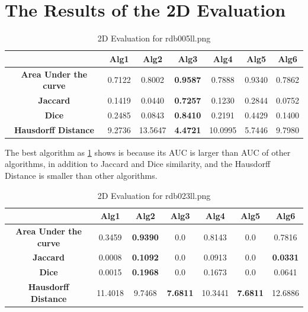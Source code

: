 \documentclass[a4paper, 11pt]{article}
\begin{document}


\section*{The Results of the 2D Evaluation \cite{wikipedia_2022} \cite{wikipedia_2023}} 

\begin{table}[h!]
\centering
\begin{tabular}{|c|c|c|c|c|c|c|}
\hline
{} & \textbf{Alg1} & \textbf{Alg2} & \textbf{Alg3} & \textbf{Alg4} & \textbf{Alg5} & \textbf{Alg6} \\
\hline
\textbf{Area Under the curve} & 0.7122 & 0.8002 & \textbf{0.9587} & 0.7888 & 0.9340 & 0.7862 \\
\hline
\textbf{Jaccard} & 0.1419 & 0.0440 & \textbf{0.7257} & 0.1230 & 0.2844 & 0.0752 \\
\hline
\textbf{Dice} & 0.2485 & 0.0843 & \textbf{0.8410} & 0.2191 & 0.4429 & 0.1400 \\
\hline
\textbf{Hausdorff Distance} & {9.2736} & {13.5647} & \textbf{4.4721} & {10.0995} & {5.7446} & {9.7980} \\
\hline
\end{tabular}
\caption{\label{tab:2d_evaluation1} 2D Evaluation for rdb005ll.png}
\end{table}

The best algorithm as \ref{tab:2d_evaluation1} shows is  because its AUC is larger than AUC of other algorithms, in addition to Jaccard and Dice similarity, and the Hausdorff Distance is smaller than other algorithms.

\begin{table}[h!]
\centering
\begin{tabular}{|c|c|c|c|c|c|c|}
\hline
{} & \textbf{Alg1} & \textbf{Alg2} & \textbf{Alg3} & \textbf{Alg4} & \textbf{Alg5} & \textbf{Alg6} \\
\hline
\textbf{Area Under the curve} & {0.3459} & \textbf{0.9390} & {0.0} & {0.8143} & {0.0} & {0.7816} \\
\hline
\textbf{Jaccard} & {0.0008} & \textbf{0.1092} & {0.0} & {0.0913} & {0.0} & \textbf{0.0331} \\
\hline
\textbf{Dice} & {0.0015} & \textbf{0.1968} & {0.0} & {0.1673} & {0.0} & {0.0641} \\
\hline
\textbf{Hausdorff Distance} & {11.4018} & {9.7468} & \textbf{7.6811} & {10.3441} & \textbf{7.6811} & {12.6886} \\
\hline
\end{tabular}
\caption{\label{tab:2d_evaluation2} 2D Evaluation for rdb023ll.png}
\end{table}
\end{document}
